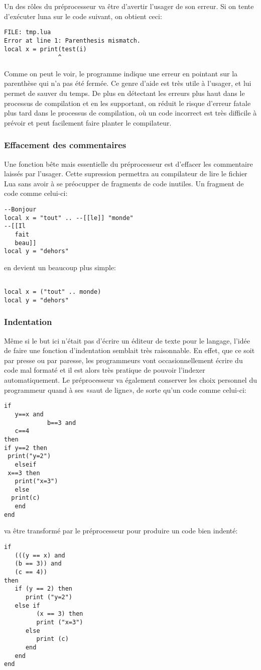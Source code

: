 \documentclass{article}
\begin{document}
Un des rôles du préprocesseur va être d'avertir l'usager de son erreur. Si on tente d'exécuter luna sur le code suivant, on obtient ceci:
\lstset{style = out}
\begin{lstlisting}
FILE: tmp.lua
Error at line 1: Parenthesis mismatch.
local x = print(test(i)
               ^
\end{lstlisting}
Comme on peut le voir, le programme indique une erreur en pointant sur la parenthèse qui n'a pas été fermée. Ce genre d'aide est très utile à l'usager, et lui permet de sauver du temps. De plus en détectant les erreurs plus haut dans le processus de compilation et en les supportant, on réduit le risque d'erreur fatale plus tard dans le processus de compilation, où un code incorrect est très difficile à prévoir et peut facilement faire planter le compilateur.

\subsubsection{Effacement des commentaires}
Une fonction bête mais essentielle du préprocesseur est d'effacer les commentaire laissés par l'usager. Cette supression permettra au compilateur de lire le fichier Lua sans avoir à se préocupper de fragments de code inutiles. Un fragment de code comme celui-ci:
\lstset{style = lua}
\begin{lstlisting}[caption={Commentaires multiples},label=DescriptiveLabel]
--Bonjour
local x = "tout" .. --[[le]] "monde"
--[[Il
   fait
   beau]]
local y = "dehors"
\end{lstlisting}
en devient un beaucoup plus simple:
\begin{lstlisting}[belowcaptionskip = -1\baselineskip]

local x = ("tout" .. monde) 
local y = "dehors"
\end{lstlisting}

\subsubsection{Indentation}
Même si le but ici n'était pas d'écrire un éditeur de texte pour le langage, l'idée de faire une fonction d'indentation semblait très raisonnable. En effet, que ce soit par presse ou par paresse, les programmeurs vont occasionnellement écrire du code mal formaté et il est alors très pratique de pouvoir l'indexer automatiquement. Le préprocesseur va également conserver les choix personnel du programmeur quand à ses «saut de ligne», de sorte qu'un code comme celui-ci:
\begin{lstlisting}[caption={Code mal formaté},label=DescriptiveLabel]
if
   y==x and
            b==3 and
   c==4
then
if y==2 then
 print("y=2")
   elseif
 x==3 then
   print("x=3")
   else
  print(c)
   end
end
\end{lstlisting}
va être transformé par le préprocesseur pour produire un code bien indenté:
\begin{lstlisting}[belowcaptionskip = -1\baselineskip]
if 
   (((y == x) and 
   (b == 3)) and 
   (c == 4)) 
then 
   if (y == 2) then 
      print ("y=2") 
   else if 
         (x == 3) then 
         print ("x=3") 
      else 
         print (c) 
      end 
   end 
end 
\end{lstlisting}
\end{document}
